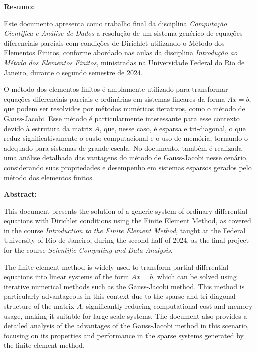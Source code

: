 \maketitle
\newpage
\begin{center}
  \textbf{Resumo:}
\end{center}

  Este documento apresenta como trabalho final da disciplina \textit{Computação Científica e Análise de Dados} a resolução de um sistema genérico de equações diferenciais parciais com condições de Dirichlet utilizando o Método dos Elementos Finitos, conforme abordado nas aulas da disciplina \textit{Introdução ao Método dos Elementos Finitos}, ministradas na Universidade Federal do Rio de Janeiro, durante o segundo semestre de 2024.

  O método dos elementos finitos é amplamente utilizado para transformar equações diferenciais parciais e ordinárias em sistemas lineares da forma $Ax = b$, que podem ser resolvidos por métodos numéricos iterativos, como o método de Gauss-Jacobi. Esse método é particularmente interessante para esse contexto devido à estrutura da matriz $A$, que, nesse caso, é esparsa e tri-diagonal, o que reduz significativamente o custo computacional e o uso de memória, tornando-o adequado para sistemas de grande escala. No documento, também é realizada uma análise detalhada das vantagens do método de Gauss-Jacobi nesse cenário, considerando suas propriedades e desempenho em sistemas esparsos gerados pelo método dos elementos finitos.

\vspace{0.3cm}

\begin{center}
  \textbf{Abstract:}
\end{center}

  This document presents the solution of a generic system of ordinary differential equations with Dirichlet conditions using the Finite Element Method, as covered in the course \textit{Introduction to the Finite Element Method}, taught at the Federal University of Rio de Janeiro, during the second half of 2024, as the final project for the course \textit{Scientific Computing and Data Analysis}.

  The finite element method is widely used to transform partial differential equations into linear systems of the form $Ax = b$, which can be solved using iterative numerical methods such as the Gauss-Jacobi method. This method is particularly advantageous in this context due to the sparse and tri-diagonal structure of the matrix $A$, significantly reducing computational cost and memory usage, making it suitable for large-scale systems. The document also provides a detailed analysis of the advantages of the Gauss-Jacobi method in this scenario, focusing on its properties and performance in the sparse systems generated by the finite element method.


\newpage \tableofcontents
\newpage
